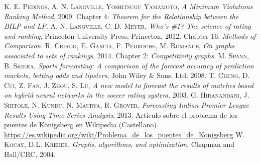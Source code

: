 \documentclass[12pt,a4paper,titlepage]{book}
\begin{document}
\begin{thebibliography}{X}
		 \textsc{K. E. Pedings, A. N. Langville, Yoshitsugu Yamamoto},
		\textit{A Minimum Violations Ranking Method}, 
		2009. Chapter 4: \textit{Theorem for the Relationship between the BILP and LP}.
		 \textsc{A. N. Langville, C. D. Meyer},
		\textit{Who's \#1? The science of rating and ranking}, 
		Princeton University Press, Princeton, 2012. Chapter 16: \textit{Methods of Comparison}.
		 \textsc{R. Criado, E. García, F. Pedroche, M. Romance},
		\textit{On graphs associated to sets of rankings}, 
		2014. Chapter 2: \textit{Competitivity graphs}.
		 \textsc{M. Spann, B. Skiera},
		\textit{Sports forecasting: A comparison of the forecast accuracy of prediction markets, betting odds and tipsters}, 
		John Wiley \& Sons, Ltd. 2008. 
		 \textsc{T. Cheng, D. Cui, Z. Fan, J. Zhou, S. Lu},
		\textit{A new model to forecast the results of matches based on hybrid neural networks in the soccer rating system}, 
		2003. 
		 \textsc{G. Hiranandani, J. Shitole, N. Kundu, N. Maurya, R. Grover},
		\textit{Forecasting Indian Premier League Results Using Time Series Analysis}, 
		2013. 	
		Artículo sobre el problema de los puentes de Königsberg en Wikipedia (Castellano). \url{https://es.wikipedia.org/wiki/Problema_de_los_puentes_de_Konigsberg}
		 \textsc{W. Kocay, D.L. Kreher},
		\textit{Graphs, algorithms, and optimization}, 
		Chapman and Hall/CRC, 2004.
	\end{thebibliography}

	
	
\end{document}
